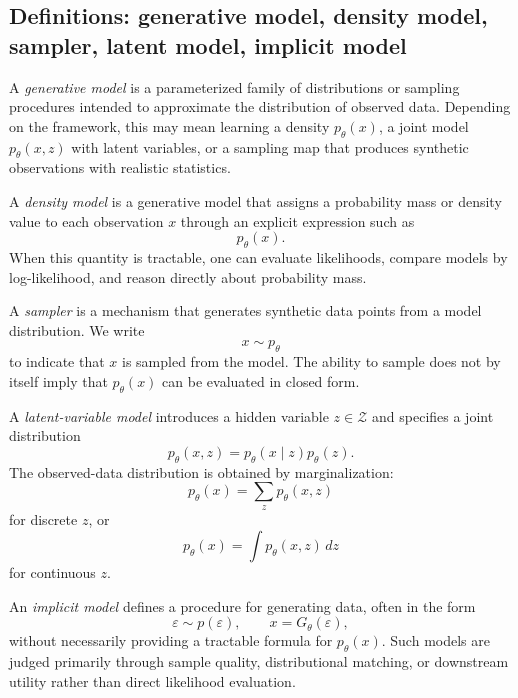 \subsection*{Definitions: generative model, density model, sampler, latent model, implicit model}

\begin{definition}
A \emph{generative model} is a parameterized family of distributions or sampling procedures intended to approximate the distribution of observed data.
Depending on the framework, this may mean learning a density $p_\theta(x)$, a joint model $p_\theta(x,z)$ with latent variables, or a sampling map that produces synthetic observations with realistic statistics.
\end{definition}

\begin{definition}
A \emph{density model} is a generative model that assigns a probability mass or density value to each observation $x$ through an explicit expression such as
\[
p_\theta(x).
\]
When this quantity is tractable, one can evaluate likelihoods, compare models by log-likelihood, and reason directly about probability mass.
\end{definition}

\begin{definition}[Sampler]
A \emph{sampler} is a mechanism that generates synthetic data points from a model distribution.
We write
\[
x \sim p_\theta
\]
to indicate that $x$ is sampled from the model.
The ability to sample does not by itself imply that $p_\theta(x)$ can be evaluated in closed form.
\end{definition}

\begin{definition}
A \emph{latent-variable model} introduces a hidden variable $z\in\mathcal{Z}$ and specifies a joint distribution
\[
p_\theta(x,z) = p_\theta(x\mid z)p_\theta(z).
\]
The observed-data distribution is obtained by marginalization:
\[
p_\theta(x) = \sum_z p_\theta(x,z)
\]
for discrete $z$, or
\[
p_\theta(x) = \int p_\theta(x,z)\,dz
\]
for continuous $z$.
\end{definition}

\begin{definition}
An \emph{implicit model} defines a procedure for generating data, often in the form
\[
\varepsilon \sim p(\varepsilon),
\qquad
x = G_\theta(\varepsilon),
\]
without necessarily providing a tractable formula for $p_\theta(x)$.
Such models are judged primarily through sample quality, distributional matching, or downstream utility rather than direct likelihood evaluation.
\end{definition}

